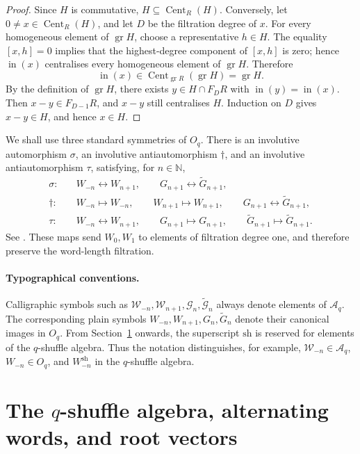 \documentclass[11pt]{extarticle}
\theoremstyle{definition}
\theoremstyle{remark}
\numberwithin{equation}{section}
\newcommand{\N}{\mathbb N}
\newcommand{\Oq}{O_q}
\newcommand{\Aq}{\mathcal A_q}
\newcommand{\gr}{\operatorname{gr}}
\newcommand{\init}{\operatorname{in}}
\newcommand{\sh}{\mathrm{sh}}
\newcommand{\cW}{\mathcal W}
\newcommand{\cG}{\mathcal G}
\newcommand{\ctG}{\widetilde{\mathcal G}}
\DeclareMathOperator{\Cent}{Cent}
\begin{document}
\begin{proof}
Since \(H\) is commutative, \(H\subseteq\Cent_R(H)\).  Conversely, let
\(0\neq x\in\Cent_R(H)\), and let \(D\) be the filtration degree of \(x\).
For every homogeneous element of \(\gr H\), choose a representative
\(h\in H\).  The equality \([x,h]=0\) implies that the highest-degree
component of \([x,h]\) is zero; hence \(\init(x)\) centralises every
homogeneous element of \(\gr H\).  Therefore
\[
        \init(x)\in \Cent_{\gr R}(\gr H)=\gr H .
\]
By the definition of \(\gr H\), there exists \(y\in H\cap F_DR\) with
\(\init(y)=\init(x)\).  Then \(x-y\in F_{D-1}R\), and \(x-y\) still
centralises \(H\).  Induction on \(D\) gives \(x-y\in H\), and hence
\(x\in H\).
\end{proof}

We shall use three standard symmetries of \(\Oq\).  There is an involutive
automorphism \(\sigma\), an involutive antiautomorphism \(\dagger\), and an
involutive antiautomorphism \(\tau\), satisfying, for \(n\in\N\),
\begin{align*}
\sigma:&\quad
 W_{-n}\leftrightarrow W_{n+1},
 \qquad
 G_{n+1}\leftrightarrow\widetilde G_{n+1},\\
\dagger:&\quad
 W_{-n}\mapsto W_{-n},
 \qquad
 W_{n+1}\mapsto W_{n+1},
 \qquad
 G_{n+1}\leftrightarrow\widetilde G_{n+1},\\
\tau:&\quad
 W_{-n}\leftrightarrow W_{n+1},
 \qquad
 G_{n+1}\mapsto G_{n+1},
 \qquad
 \widetilde G_{n+1}\mapsto\widetilde G_{n+1}.
\end{align*}
See \cite[Definitions~3.4--3.6 and Theorem~11.6]{Terwilliger2022OqACE}.
These maps send \(W_0,W_1\) to elements of filtration degree one, and
therefore preserve the word-length filtration.

\paragraph{Typographical conventions.}
Calligraphic symbols such as
\(\cW_{-n},\cW_{n+1},\cG_n,\ctG_n\) always denote elements of \(\Aq\).
The corresponding plain symbols
\(W_{-n},W_{n+1},G_n,\widetilde G_n\) denote their canonical images in
\(\Oq\).  From Section~\ref{sec:qshuffle} onwards, the superscript
\(\sh\) is reserved for elements of the \(q\)-shuffle algebra.  Thus the
notation distinguishes, for example, \(\cW_{-n}\in\Aq\),
\(W_{-n}\in\Oq\), and \(W_{-n}^{\sh}\) in the \(q\)-shuffle algebra.




\section{The \texorpdfstring{$q$}{q}-shuffle algebra, alternating words, and root vectors}
\label{sec:qshuffle}
\end{document}
